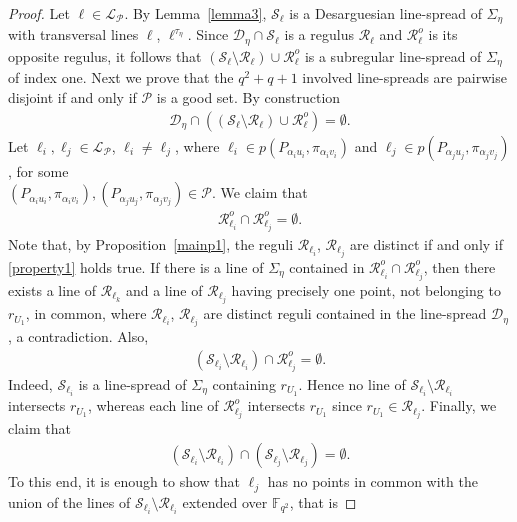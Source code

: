 \documentclass[11pt]{article}
\theoremstyle{definition}
\numberwithin{equation}{section}
\def\cL{\mathcal L}
\def\cP{\mathcal P}
\def\cD{\mathcal D}
\def\cR{\mathcal R}
\def\cS{\mathcal S}
\def\F{{\mathbb F}}
\begin{document}
\begin{proof}
Let $\ell \in \cL_{\cP}$. By Lemma~\ref{lemma3}, $\cS_\ell$ is a Desarguesian line-spread of $\Sigma_{\eta}$ with transversal lines $\ell$, $\ell^{\tau_{\eta}}$. Since $\cD_{\eta} \cap \cS_\ell$ is a regulus $\cR_\ell$ and $\cR_\ell^o$ is its opposite regulus, it follows that $\left(\cS_\ell \setminus \cR_{\ell}\right) \cup \cR_{\ell}^{o}$ is a subregular line-spread of $\Sigma_{\eta}$ of index one. Next we prove that the $q^2+q+1$ involved line-spreads are pairwise disjoint if and only if $\cP$ is a good set. By construction
\begin{align*}
\cD_{\eta} \cap  \left((\cS_\ell \setminus \cR_{\ell}) \cup \cR_{\ell}^o\right) = \emptyset.
\end{align*}
Let $\ell_i, \ell_j \in \cL_{\cP}$, $\ell_i \ne \ell_j$, where $\ell_{i} \in p\left( P_{\alpha_{i} u_i}, \pi_{\alpha_{i} v_i} \right)$ and $\ell_j \in p\left( P_{\alpha_{j} u_{j}}, \pi_{\alpha_{j} v_{j}} \right)$, for some \\ $\left( P_{\alpha_{i} u_i}, \pi_{\alpha_{i} v_i} \right), \left( P_{\alpha_{j} u_{j}}, \pi_{\alpha_{j} v_{j}} \right) \in \cP$. We claim that 
\begin{align*}
\cR_{\ell_{i}}^o \cap \cR_{\ell_j}^o = \emptyset.
\end{align*}
Note that, by Proposition~\ref{mainp1}, the reguli $\cR_{\ell_{i}}$, $\cR_{\ell_j}$ are distinct if and only if \eqref{property1} holds true. If there is a line of $\Sigma_{\eta}$ contained in $\cR_{\ell_i}^o \cap \cR_{\ell_j}^o$, then there exists a line of $\cR_{\ell_{k}}$ and a line of $\cR_{\ell_j}$ having precisely one point, not belonging to $r_{U_1}$, in common, where $\cR_{\ell_{i}}$, $\cR_{\ell_j}$ are distinct reguli contained in the line-spread $\cD_{\eta}$, a contradiction. Also,
\begin{align*}
\left(\cS_{\ell_i} \setminus \cR_{\ell_i} \right) \cap \cR_{\ell_j}^o = \emptyset.
\end{align*}
Indeed, $\cS_{\ell_i}$ is a line-spread of $\Sigma_{\eta}$ containing $r_{U_1}$. Hence no line of $\cS_{\ell_i} \setminus \cR_{\ell_i}$ intersects $r_{U_1}$, whereas each line of $\cR_{\ell_j}^o$ intersects $r_{U_1}$ since $r_{U_1} \in \cR_{\ell_j}$. Finally, we claim that 
\begin{align*}
\left( \cS_{\ell_i} \setminus \cR_{\ell_i} \right) \cap \left( \cS_{\ell_j} \setminus \cR_{\ell_j} \right) = \emptyset.
\end{align*}
To this end, it is enough to show that $\ell_j$ has no points in common with the union of the lines of $\cS_{\ell_i} \setminus \cR_{\ell_i}$ extended over $\F_{q^2}$, that is

\end{proof}
\end{document}
